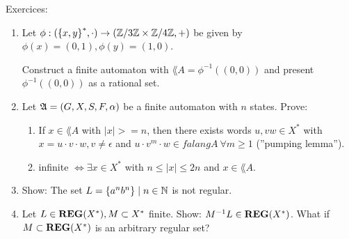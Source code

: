 Exercices:
\begin{enumerate}
  \item Let $\phi : (\mbox{$\{x, y\}$}^*, \cdot) \to (\mathbb{Z} / 3 \mathbb{Z}
  \times \mathbb{Z} / 4 \mathbb{Z}, +)$ be given by $\phi(x) = (0,1), \phi(y) = (1,0)$.
  
  Construct a finite automaton  with $\lang{A} = \phi^{-1}((0,0))$ and
  present $\phi^{-1}((0,0))$ as a rational set.
  
  \item Let $\mbox{$\mathfrak{A}$} = (G, X, S, F, \alpha)$ be a finite automaton with $n$
  states. Prove:
  \begin{enumerate}
    \item If $x \in \lang{A}$ with $|x| >= n$, then there exists words $u, v
    w \in X^*$ with $x = u \cdot v \cdot w, v \neq \epsilon$ and $u \cdot v^m
    \cdot w \in falang{A}\ \forall m \geq 1$ (''pumping lemma'').
    \item {} infinite $\Leftrightarrow \exists x \in X^*$ with $n \leq
    |x| \leq 2n$ and $x \in \lang{A}$.
   \end {enumerate}

	\item Show: The set $L = \mbox{$\{a^n b^n\}$} \mid n \in \mathbb{N}$ is not
	regular.
	
	\item Let $L \in \mbox{{\bf REG}}(X^*), M \subset X^*$ finite. Show: $M^{-1}L \in \mbox{{\bf REG}}(X^*)$.
	What if $M \subset \mbox{{\bf REG}}(X^*)$ is an arbitrary regular set?
\end{enumerate}

